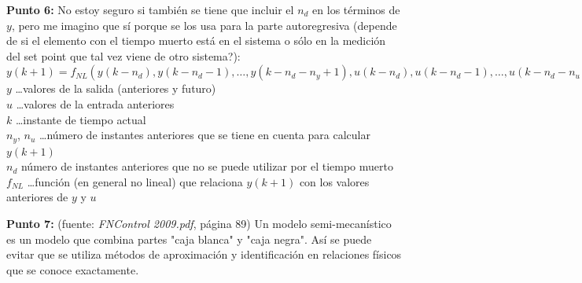 \documentclass[10pt,onecolumn,twoside,letterpaper]{article}
\newcommand{\myreferences}{../../bib/library}
\begin{document}
\par{\bf \large Punto 6:} No estoy seguro si también se tiene que incluir el $n_d$ en los términos de $y$, pero me imagino que sí porque se los usa para la parte autoregresiva (depende de si el elemento con el tiempo muerto está en el sistema o sólo en la medición del set point que tal vez viene de otro sistema?):\\ $y(k+1)=f_{NL}(y(k-n_d),y(k-n_d-1),\dots,y(k-n_d-n_y+1),u(k-n_d),u(k-n_d-1),\dots,u(k-n_d-n_u+1))$\\
$y$ \dots valores de la salida (anteriores y futuro)\\
$u$ \dots valores de la entrada anteriores\\
$k$ \dots instante de tiempo actual\\
$n_y$, $n_u$ \dots número de instantes anteriores que se tiene en cuenta para calcular $y(k+1)$\\
$n_d$ número de instantes anteriores que no se puede utilizar por el tiempo muerto\\
$f_{NL}$ \dots función (en general no lineal) que relaciona $y(k+1)$ con los valores anteriores de $y$ y $u$\\

\par{\bf \large Punto 7:} (fuente: \textit{FNControl 2009.pdf}, página 89) Un modelo semi-mecanístico es un modelo que combina partes "caja blanca" y "caja negra". Así se puede evitar que se utiliza métodos de aproximación y identificación en relaciones físicos que se conoce exactamente.



\end{document}
